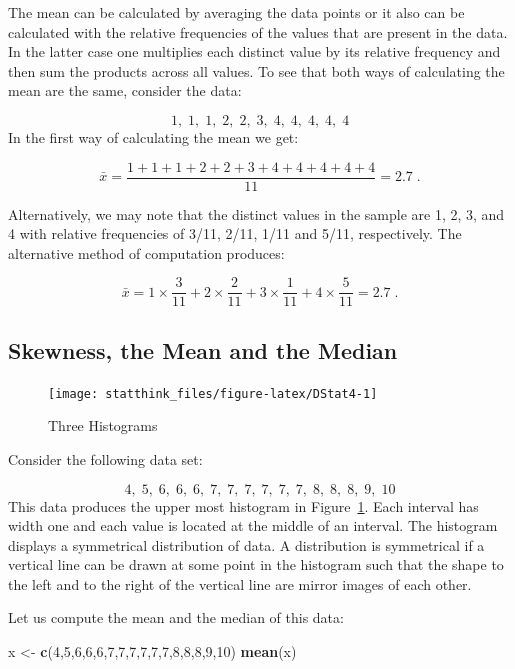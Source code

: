 \documentclass[
]{krantz}
\makeatletter
\newenvironment{Shaded}{\begin{snugshade}}{\end{snugshade}}
\newcommand{\DecValTok}[1]{\textcolor[rgb]{0.00,0.00,0.81}{#1}}
\newcommand{\KeywordTok}[1]{\textcolor[rgb]{0.13,0.29,0.53}{\textbf{#1}}}
\newcommand{\NormalTok}[1]{#1}
\newcommand{\StringTok}[1]{\textcolor[rgb]{0.31,0.60,0.02}{#1}}
\newenvironment{kframe}{%
\medskip{}
\setlength{\fboxsep}{.8em}
 \def\at@end@of@kframe{}%
 \ifinner\ifhmode%
  \def\at@end@of@kframe{\end{minipage}}%
  \begin{minipage}{\columnwidth}%
 \fi\fi%
 \def\FrameCommand##1{\hskip\@totalleftmargin \hskip-\fboxsep
 \colorbox{shadecolor}{##1}\hskip-\fboxsep
     \hskip-\linewidth \hskip-\@totalleftmargin \hskip\columnwidth}%
 \MakeFramed {\advance\hsize-\width
   \@totalleftmargin\z@ \linewidth\hsize
   \@setminipage}}%
 {\par\unskip\endMakeFramed%
 \at@end@of@kframe}
\renewenvironment{Shaded}{\begin{kframe}}{\end{kframe}}
\theoremstyle{definition}
\theoremstyle{definition}
\theoremstyle{definition}
\theoremstyle{remark}
\makeatother
\begin{document}
The mean can be calculated by averaging the data points or it also can
be calculated with the relative frequencies of the values that are
present in the data. In the latter case one multiplies each distinct
value by its relative frequency and then sum the products across all
values. To see that both ways of calculating the mean are the same,
consider the data:

\[1,\; 1,\; 1,\; 2,\; 2,\; 3,\; 4,\; 4,\; 4,\; 4,\; 4\] In the first
way of calculating the mean we get:

\[\bar x = \frac{1 + 1 + 1 + 2 + 2 + 3 + 4 + 4 + 4 + 4 + 4}{11} = 2.7\;.\]

Alternatively, we may note that the distinct values in the sample are 1,
2, 3, and 4 with relative frequencies of 3/11, 2/11, 1/11 and 5/11,
respectively. The alternative method of computation produces:

\[\bar x = 1\times \frac{3}{11} + 2 \times \frac{2}{11} + 3 \times \frac{1}{11} + 4 \times \frac{5}{11} = 2.7\;.\]

\hypertarget{skewness-the-mean-and-the-median}{%
\subsection{Skewness, the Mean and the Median}\label{skewness-the-mean-and-the-median}}

\begin{figure}

{\centering \texttt{[image: statthink\_files/figure-latex/DStat4-1]} 

}

\caption{Three Histograms}\label{fig:DStat4}
\end{figure}

Consider the following data set:

\[4,\; 5,\; 6,\; 6,\; 6,\; 7,\; 7,\; 7,\; 7,\;  7,\;  7,\;  8,\;  8,\;  8,\;  9,\;  10\]
This data produces the upper most histogram in
Figure~\ref{fig:DStat4}. Each interval has width one and each
value is located at the middle of an interval. The histogram displays a
symmetrical distribution of data. A distribution is symmetrical if a
vertical line can be drawn at some point in the histogram such that the
shape to the left and to the right of the vertical line are mirror
images of each other.

Let us compute the mean and the median of this data:

\begin{Shaded}
\begin{Highlighting}[]
\NormalTok{x <-}\StringTok{ }\KeywordTok{c}\NormalTok{(}\DecValTok{4}\NormalTok{,}\DecValTok{5}\NormalTok{,}\DecValTok{6}\NormalTok{,}\DecValTok{6}\NormalTok{,}\DecValTok{6}\NormalTok{,}\DecValTok{7}\NormalTok{,}\DecValTok{7}\NormalTok{,}\DecValTok{7}\NormalTok{,}\DecValTok{7}\NormalTok{,}\DecValTok{7}\NormalTok{,}\DecValTok{7}\NormalTok{,}\DecValTok{8}\NormalTok{,}\DecValTok{8}\NormalTok{,}\DecValTok{8}\NormalTok{,}\DecValTok{9}\NormalTok{,}\DecValTok{10}\NormalTok{)}
\KeywordTok{mean}\NormalTok{(x)}
\end{Highlighting}
\end{Shaded}
\end{document}
